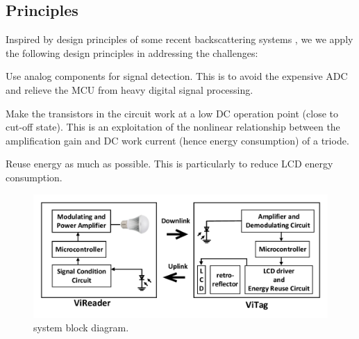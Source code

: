 \subsection{Principles}
Inspired by design principles of some recent backscattering systems \cite{abc1,abc2, abc3}, we we apply the following design principles in addressing the challenges:
\begin{Itemize}
\item Use analog components for signal detection. This is to avoid the expensive ADC and relieve the MCU from heavy digital signal processing. 
\item Make the transistors in the circuit work at a low DC operation point (\eg close to cut-off state). This is an exploitation of the nonlinear relationship between the amplification gain and DC work current (hence energy consumption) of a triode. 
\item Reuse energy as much as possible. This is particularly to reduce LCD energy consumption.
\end{Itemize}


\iffalse
\begin{figure}[t]
  \begin{center}
        \texttt{[image: ../illustrations/ReadAndTag.eps]}
      \vspace{-2em}
      \caption{\retro system diagram. The left part is the \reader and the right part is the \vitag. }\label{fig:sysdiagram}
  \end{center}
\end{figure}
\else
\begin{figure}[t]
  \begin{center}
        \includegraphics[width=\columnwidth]{fig/reader_tag_simplified.pdf}
      \vspace{-2em}
      \caption{\retro system block diagram.}\label{fig:sysdiagram}
  \end{center}
\end{figure}
\fi


